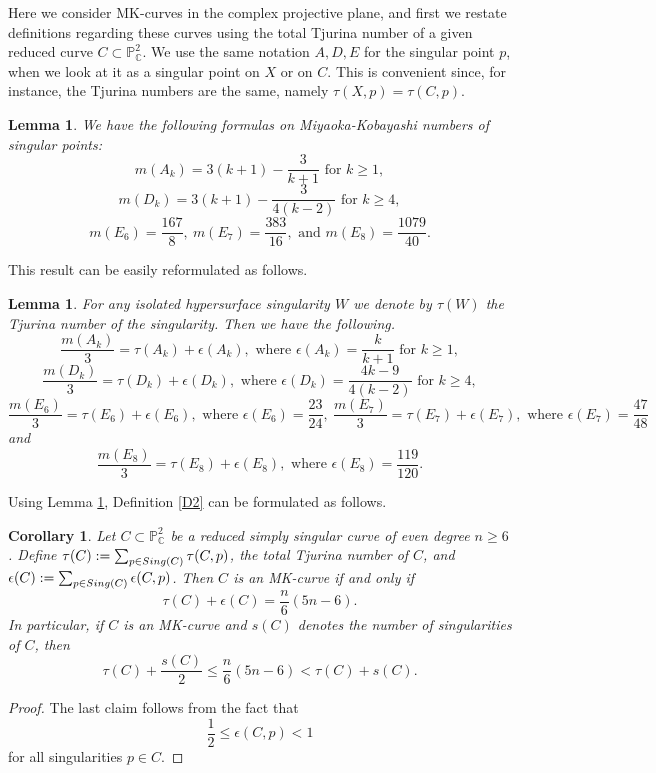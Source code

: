 \documentclass[11pt]{amsart}
\theoremstyle{plain}
\newtheorem{lemma}[thm]{Lemma}
\newtheorem{corollary}[thm]{Corollary}
\theoremstyle{definition}
\numberwithin{equation}{section}
\begin{document}
Here we consider MK-curves in the complex projective plane,  and first we restate definitions regarding these curves using the total Tjurina number of a given reduced curve $C \subset \mathbb{P}^{2}_{\mathbb{C}}$. We use the same notation $A,D,E$ for the singular point $p$, when we look at it as a singular point on $X$ or on $C$. This is convenient since, for instance, the Tjurina numbers are the same, namely $\tau(X,p)=\tau(C,p)$.
\begin{lemma} We have the following formulas on Miyaoka-Kobayashi numbers of singular points:
\label{L1}
$$m(A_k)=3(k+1)-\frac{3}{k+1}  \text{ for } k \geq 1,$$
$$m(D_{k})=3(k+1)- \frac{3}{4(k-2)} \text{ for } k \geq 4,$$
$$m(E_{6})= \frac{167}{8}, \   
m(E_{7})= \frac{383}{16},\text{ and } 
m(E_{8})= \frac{1079}{40}.$$
\end{lemma}
This result can be easily reformulated as follows.
\begin{lemma}
\label{L2}
For any isolated hypersurface singularity $W$ we denote by $\tau(W)$ the Tjurina number of the singularity. Then we have the following.
$$\frac{m(A_k)}{3}= \tau(A_k)+\epsilon(A_k), \text{ where }\epsilon(A_k)=\frac{k}{k+1}  \text{ for } k \geq 1,$$
$$   \frac{m(D_k)}{3}= \tau(D_k)+\epsilon(D_k), \text{ where }\epsilon(D_k)=\frac{4k-9}{4(k-2)}     \text{ for } k \geq 4,$$
$$\frac{m(E_6)}{3}= \tau(E_6)+\epsilon(E_6), \text{ where }\epsilon(E_6)=\frac{23}{24}, \  
\frac{m(E_7)}{3}= \tau(E_7)+\epsilon(E_7), \text{ where }\epsilon(E_7)=\frac{47}{48} $$ and 
$$\frac{m(E_8)}{3}= \tau(E_8)+\epsilon(E_8), \text{ where }\epsilon(E_8)=\frac{119}{120}.$$
\end{lemma}
Using Lemma \ref{L2}, Definition \ref{D2} can be formulated as follows.
\begin{corollary}
\label{C1}
Let $C \subset \mathbb{P}^{2}_{\mathbb{C}}$ be a reduced simply singular curve of even degree $n\geq 6$. Define $\tau(C):=\sum_{p \in {\rm Sing}(C)}\tau(C,p)$, the total Tjurina number of $C$, and $\epsilon(C):=\sum_{p \in {\rm Sing}(C)}\epsilon(C,p)$. Then $C$ is an MK-curve if and only if 
$$\tau(C)+\epsilon(C) = \frac{n}{6}(5n-6).$$
In particular, if $C$ is an MK-curve and $s(C)$ denotes the number of singularities of $C$, then
$$\tau(C)+\frac{s(C)}{2} \leq \frac{n}{6}(5n-6) < \tau(C) +s(C).$$
\end{corollary}
\begin{proof}
The last claim follows from the fact that
$$ \frac{1}{2} \leq \epsilon(C,p) < 1$$
for all singularities $p \in C$.
\end{proof}
\end{document}
